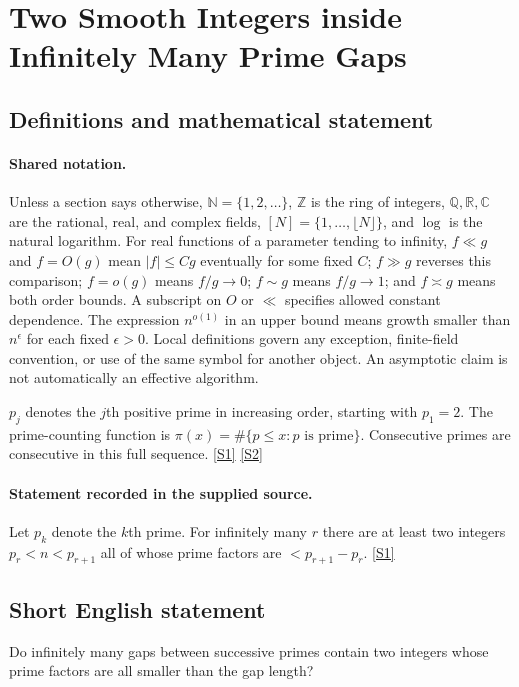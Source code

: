 \documentclass[11pt,a4paper]{article}
\newcommand{\N}{\mathbb{N}}
\newcommand{\Z}{\mathbb{Z}}
\newcommand{\Q}{\mathbb{Q}}
\newcommand{\R}{\mathbb{R}}
\newcommand{\C}{\mathbb{C}}
\newcommand{\sref}[2]{\hyperlink{source:#1:#2}{[S#2]}}
\begin{document}
\section{Two Smooth Integers inside Infinitely Many Prime Gaps}\label{statement}


\subsection{Definitions and mathematical statement}

\paragraph{Shared notation.}Unless a section says otherwise, $\N=\{1,2,\ldots\}$,
$\Z$ is the ring of integers, $\Q,\R,\C$ are the rational, real, and complex
fields, $[N]=\{1,\ldots,\lfloor N\rfloor\}$, and $\log$ is the natural
logarithm. For real functions of a parameter tending to infinity,
$f\ll g$ and $f=O(g)$ mean $|f|\leq Cg$ eventually for some fixed $C$;
$f\gg g$ reverses this comparison; $f=o(g)$ means $f/g\to0$;
$f\sim g$ means $f/g\to1$; and $f\asymp g$ means both order bounds.
A subscript on $O$ or $\ll$ specifies allowed constant dependence.
The expression $n^{o(1)}$ in an upper bound means growth smaller than
$n^\epsilon$ for each fixed $\epsilon>0$. Local definitions govern any
exception, finite-field convention, or use of the same symbol for another
object. An asymptotic claim is not automatically an effective algorithm.



$p_j$ denotes the $j$th positive prime in increasing order, starting with $p_1=2$. The prime-counting function is $\pi(x)=\#\{p\leq x:p\text{ is prime}\}$. Consecutive primes are consecutive in this full sequence. \sref{statement}{1} \sref{statement}{2}

\paragraph{Statement recorded in the supplied source.}
Let $p_k$ denote the $k$th prime. For infinitely many $r$ there are at least two integers $p_r<n<p_{r+1}$ all of whose prime factors are $<p_{r+1}-p_r$. \sref{statement}{1}

\subsection{Short English statement}

Do infinitely many gaps between successive primes contain two integers whose prime factors are all smaller than the gap length?
\end{document}
